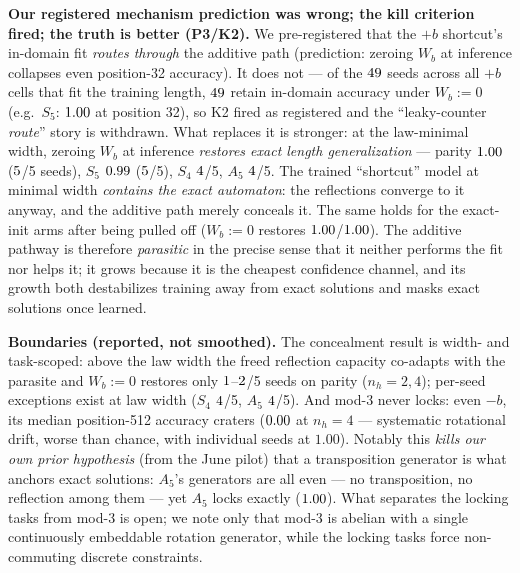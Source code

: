 \documentclass[10pt]{article}
\begin{document}
\textbf{Our registered mechanism prediction was wrong; the kill criterion fired; the truth is
better (P3/K2).} We pre-registered that the $+b$ shortcut's in-domain fit \emph{routes through} the
additive path (prediction: zeroing $W_b$ at inference collapses even position-32 accuracy). It does
not --- of the $49$ seeds across all $+b$ cells that fit the training length,
$49$ retain in-domain accuracy under $W_b{:=}0$ (e.g.\ $S_5$:
$1.00$ at position 32), so K2 fired as registered and the ``leaky-counter
\emph{route}'' story is withdrawn. What replaces it is stronger: at the law-minimal width, zeroing
$W_b$ at inference \emph{restores exact length generalization} --- parity
$1.00$ ($5$/5 seeds), $S_5$ $0.99$
($5$/5), $S_4$ $4$/5, $A_5$ $4$/5. The
trained ``shortcut'' model at minimal width \emph{contains the exact automaton}: the reflections
converge to it anyway, and the additive path merely conceals it. The same holds for the exact-init
arms after being pulled off ($W_b{:=}0$ restores $1.00$/$1.00$).
The additive pathway is therefore \emph{parasitic} in the precise sense that it neither performs the
fit nor helps it; it grows because it is the cheapest confidence channel, and its growth both
destabilizes training away from exact solutions and masks exact solutions once learned.

\textbf{Boundaries (reported, not smoothed).} The concealment result is width- and task-scoped:
above the law width the freed reflection capacity co-adapts with the parasite and $W_b{:=}0$ restores
only $1$--$2$/5 seeds on parity ($n_h{=}2,4$); per-seed
exceptions exist at law width ($S_4$ $4$/5, $A_5$ $4$/5).
And mod-3 never locks: even $-b$, its median position-512 accuracy craters
($0.00$ at $n_h{=}4$ --- systematic rotational drift, worse than chance,
with individual seeds at $1.00$). Notably this \emph{kills our own prior hypothesis} (from the June
pilot) that a transposition generator is what anchors exact solutions: $A_5$'s generators are all
even --- no transposition, no reflection among them --- yet $A_5$ locks exactly
($1.00$). What separates the locking tasks from mod-3 is open; we note only
that mod-3 is abelian with a single continuously embeddable rotation generator, while the locking
tasks force non-commuting discrete constraints.
\end{document}
